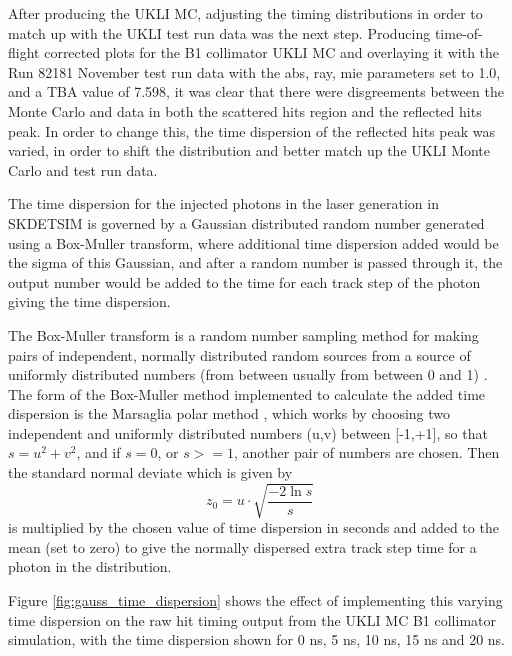 






After producing the UKLI MC, adjusting the timing distributions in order to match up with the UKLI test run data was the next step. Producing time-of-flight corrected plots for the B1 collimator UKLI MC and overlaying it with the Run 82181 November test run data with the abs, ray, mie parameters set to 1.0, and a TBA value of 7.598, it was clear that there were disgreements between the Monte Carlo and data in both the scattered hits region and the reflected hits peak. In order to change this, the time dispersion of the reflected hits peak was varied, in order to shift the distribution and better match up the UKLI Monte Carlo and test run data. 

The time dispersion for the injected photons in the laser generation in SKDETSIM is governed by a Gaussian distributed random number generated using a Box-Muller transform, where additional time dispersion added would be the sigma of this Gaussian, and after a random number is passed through it, the output number would be added to the time for each track step of the photon giving the time dispersion.

The Box-Muller transform is a random number sampling method for making pairs of independent, normally distributed random sources from a source of uniformly distributed numbers (from between usually from between 0 and 1) \cite{10.1214/aoms/1177706645}. The form of the Box-Muller method implemented to calculate the added time dispersion is the Marsaglia polar method \cite{doi:10.1137/1006063}, which works by choosing two independent and uniformly distributed numbers (u,v) between [-1,+1], so that $s = u^{2} + v^{2}$, and if $s=0$, or $s>=1$, another pair of numbers are chosen. Then the standard normal deviate which is given by $$z_{0}=u \cdot \sqrt{\frac{-2 \ln s}{s}}$$ is multiplied by the chosen value of time dispersion in seconds and added to the mean (set to zero) to give the normally dispersed extra track step time for a photon in the distribution. 

Figure \ref{fig:gauss_time_dispersion} shows the effect of implementing this varying time dispersion on the raw hit timing output from the UKLI MC B1 collimator simulation, with the time dispersion shown for 0 ns, 5 ns, 10 ns, 15 ns and 20 ns. 


